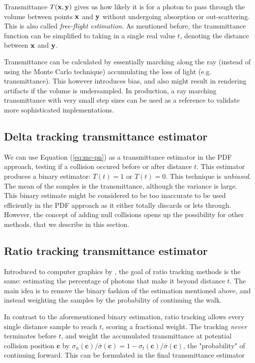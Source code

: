 Transmittance $T(\textbf{x}, \textbf{y})$ gives us how likely it is for a photon to pass through the volume between points $\textbf{x}$ and $\textbf{y}$ without undergoing absorption or out-scattering. This is also called \textit{free-flight estimation}. As mentioned before, the transmittance function can be simplified to taking in a single real value $t$, denoting the distance between $\textbf{x}$ and
$\textbf{y}$.

Transmittance can be calculated by essentially marching along the ray (instead of using the Monte Carlo technique) accumulating the loss of light (e.g. transmittance). This however introduces bias, and also might result in rendering artifacts if the volume is undersampled. In production, a ray marching transmittance with very small step sizes can be used as a reference to validate more sophisticated implementations\cite{SG17}.

\subsection{Delta tracking transmittance estimator}
We can use Equation (\ref{eq:mc-pn}) as a transmittance estimator in the PDF approach, testing if a collision occured before or after distance $t$. This estimator produces a binary estimator: $T(t) = 1$ or $T(t) = 0$. This technique is \textit{unbiased}.\cite{Novak18} The mean of the samples is the transmittance, although the variance is large. This binary estimate might be considered to be too inaccurate to be used efficiently in the PDF approach as it either totally discards or lets through.\cite{SG17} However, the concept of adding null collisions opens up the possibility for other methods, that we describe in this section. 

\subsection{Ratio tracking transmittance estimator}
Introduced to computer graphics by \cite{novak2014residual}, the goal of ratio tracking methods is the same: estimating the percentage of photons that make it beyond distance $t$. The main idea is to remove the binary fashion of the estimation mentioned above, and instead weighting the samples by the probability of continuing the walk. 

In contrast to the aforementioned binary estimation, ratio tracking allows every single distance sample to reach $t$, scoring a fractional weight. The tracking \textit{never} terminates before $t$, and weight the accumulated transmittance at potential collision position $\textbf{c}$ by $\sigma_n(\textbf{c})/\bar\sigma(\textbf{c}) = 1- \sigma_t(\textbf{c})/\bar\sigma(\textbf{c})$, the "probability" of continuing forward. This can be formulated in the final transmittance estimator

